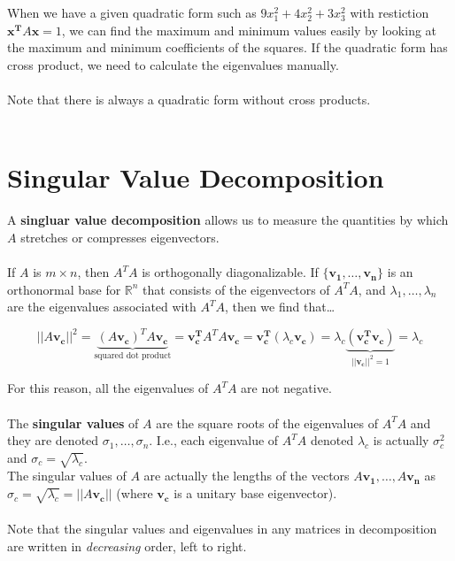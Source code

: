 \documentclass[12pt]{article}
\newcommand{\R}{\mathbb{R}}
\newcommand{\bt}[1]{\textbf{{#1}}}
\newcommand{\bm}[1]{\mathbf{{#1}}}
\newcommand{\set}[1]{\{{#1}\}}
\newcommand{\norm}[1]{||{#1}||}
\begin{document}
When we have a given quadratic form such as $9x_1^2 + 4x_2^2 + 3x_3^2$
with restiction $\bm{x^T}A\bm{x} = 1$, we can find the maximum and minimum
values easily by looking at the maximum and minimum coefficients of the squares. If
the quadratic form has cross product, we need to calculate the eigenvalues manually. \\ \\

Note that there is always a quadratic form without cross products. \\ \\

\section*{Singular Value Decomposition}

A \bt{singluar value decomposition} allows us to measure the quantities
by which $A$ stretches or compresses eigenvectors. \\ \\

If $A$ is $m \times n$, then $A^TA$ is orthogonally diagonalizable. If $\set{\bm{v_1,\dots,v_n}}$
is an orthonormal base for $\R^n$ that consists of the eigenvectors of $A^TA$, and $\lambda_1,\dots,\lambda_n$
are the eigenvalues associated with $A^TA$, then we find that\dots

$$\norm{A\bm{v_c}}^2 = \underbrace{(A\bm{v_c})^TA\bm{v_c}}_{\textrm{squared dot product}} = \bm{v_c^T}A^TA\bm{v_c} = \bm{v_c^T}(\lambda_c \bm{v_c}) = \lambda_c \underbrace{(\bm{v_c^T}\bm{v_c})}_{\norm{\bm{v_c}}^2 = 1} = \lambda_c$$

For this reason, all the eigenvalues of $A^TA$ are not negative. \\ \\

The \bt{singular values} of $A$ are the square roots of the eigenvalues of $A^TA$
and they are denoted $\sigma_1,\dots,\sigma_n$. I.e., each eigenvalue
of $A^TA$ denoted $\lambda_c$ is actually $\sigma_c^2$ and $\sigma_c = \sqrt{\lambda_c}$. \\

The singular values of $A$ are actually the lengths of the vectors $A\bm{v_1},\dots,A\bm{v_n}$ as $\sigma_c = \sqrt{\lambda_c} = \norm{A\bm{v_c}}$ (where $\bm{v_c}$ is a unitary base eigenvector). \\ \\

Note that the singular values and eigenvalues in any matrices in decomposition are written in \emph{decreasing} order, left to right. \\ \\
\end{document}
